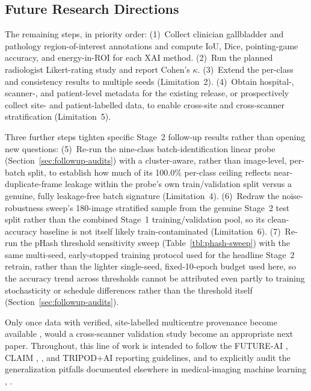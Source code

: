 \subsection{Future Research Directions}
\label{sec:future-research}

The remaining steps, in priority order: (1)~Collect clinician gallbladder and pathology region-of-interest annotations and compute IoU, Dice, pointing-game accuracy, and energy-in-ROI for each XAI method. (2)~Run the planned radiologist Likert-rating study and report Cohen's $\kappa$. (3)~Extend the per-class and consistency results to multiple seeds (Limitation~2). (4)~Obtain hospital-, scanner-, and patient-level metadata for the existing release, or prospectively collect site- and patient-labelled data, to enable cross-site and cross-scanner stratification (Limitation~5).

Three further steps tighten specific Stage~2 follow-up results rather than opening new questions: (5)~Re-run the nine-class batch-identification linear probe (Section~\ref{sec:followup-audits}) with a cluster-aware, rather than image-level, per-batch split, to establish how much of its 100.0\% per-class ceiling reflects near-duplicate-frame leakage within the probe's own train/validation split versus a genuine, fully leakage-free batch signature (Limitation~4). (6)~Redraw the noise-robustness sweep's 180-image stratified sample from the genuine Stage~2 test split rather than the combined Stage~1 training/validation pool, so its clean-accuracy baseline is not itself likely train-contaminated (Limitation~6). (7)~Re-run the pHash threshold sensitivity sweep (Table~\ref{tbl:phash-sweep}) with the same multi-seed, early-stopped training protocol used for the headline Stage~2 retrain, rather than the lighter single-seed, fixed-10-epoch budget used here, so the accuracy trend across thresholds cannot be attributed even partly to training stochasticity or schedule differences rather than the threshold itself (Section~\ref{sec:followup-audits}).

Only once data with verified, site-labelled multicentre provenance become available \cite{ref50}, would a cross-scanner validation study become an appropriate next paper. Throughout, this line of work is intended to follow the FUTURE-AI \cite{ref51}, CLAIM \cite{ref52}, \cite{ref53}, and TRIPOD+AI \cite{ref54} reporting guidelines, and to explicitly audit the generalization pitfalls documented elsewhere in medical-imaging machine learning \cite{ref55}, \cite{ref56}.
